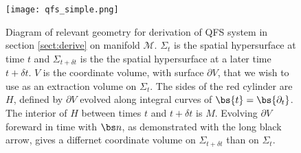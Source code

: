 \begin{figure}[h]
{\texttt{[image: qfs\_simple.png]}}
\caption{Diagram of relevant geometry for derivation of QFS system in section \ref{sect:derive} on manifold $\mathcal{M}$. $\Sigma_t$ is the spatial hypersurface at time $t$ and $\Sigma_{t+\delta t}$ is the the spatial hypersurface at a later time $t+\delta t$. $V$ is the coordinate volume, with surface $\partial V$, that we wish to use as an extraction volume on $\Sigma_t$. The sides of the red cylinder are $H$, defined by $\partial V$ evolved along integral curves of $\bs{t}=\bs{\partial_t}$. The interior of $H$ between times $t$ and $t+\delta t$ is $M$. Evolving $\partial V$ foreward in time with $\bs n$, as demonstrated with the long black arrow, gives a differnet coordinate volume on $\Sigma_{t+\delta t}$ than on $\Sigma_t$.}
\label{fig:qfs_geometry}
\end{figure}

